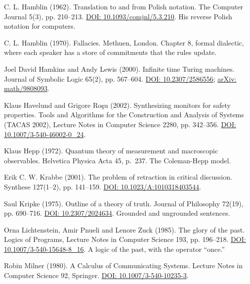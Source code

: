 \noindent C. L. Hamblin (1962). Translation to and from Polish notation. The Computer Journal 5(3), pp. 210--213. \href{https://doi.org/10.1093/comjnl/5.3.210}{DOI: 10.1093/comjnl/5.3.210}. His reverse Polish notation for computers.
\par\medskip

\noindent C. L. Hamblin (1970). Fallacies. Methuen, London. Chapter 8, formal dialectic, where each speaker has a store of commitments that the rules update.
\par\medskip

\noindent Joel David Hamkins and Andy Lewis (2000). Infinite time Turing machines. Journal of Symbolic Logic 65(2), pp. 567--604. \href{https://doi.org/10.2307/2586556}{DOI: 10.2307/2586556}; \href{https://arxiv.org/abs/math/9808093}{arXiv: math/9808093}.
\par\medskip

\noindent Klaus Havelund and Grigore Ro\c{s}u (2002). Synthesizing monitors for safety properties. Tools and Algorithms for the Construction and Analysis of Systems (TACAS 2002), Lecture Notes in Computer Science 2280, pp. 342--356. \href{https://doi.org/10.1007/3-540-46002-0_24}{DOI: 10.1007/3-540-46002-0\_24}.
\par\medskip

\noindent Klaus Hepp (1972). Quantum theory of measurement and macroscopic observables. Helvetica Physica Acta 45, p.~237. The Coleman-Hepp model.
\par\medskip

\noindent Erik C. W. Krabbe (2001). The problem of retraction in critical discussion. Synthese 127(1--2), pp. 141--159. \href{https://doi.org/10.1023/A:1010318403544}{DOI: 10.1023/A:1010318403544}.
\par\medskip

\noindent Saul Kripke (1975). Outline of a theory of truth. Journal of Philosophy 72(19), pp. 690--716. \href{https://doi.org/10.2307/2024634}{DOI: 10.2307/2024634}. Grounded and ungrounded sentences.
\par\medskip

\noindent Orna Lichtenstein, Amir Pnueli and Lenore Zuck (1985). The glory of the past. Logics of Programs, Lecture Notes in Computer Science 193, pp. 196--218. \href{https://doi.org/10.1007/3-540-15648-8_16}{DOI: 10.1007/3-540-15648-8\_16}. A logic of the past, with the operator ``once.''
\par\medskip

\noindent Robin Milner (1980). A Calculus of Communicating Systems. Lecture Notes in Computer Science 92, Springer. \href{https://doi.org/10.1007/3-540-10235-3}{DOI: 10.1007/3-540-10235-3}.
\par\medskip

